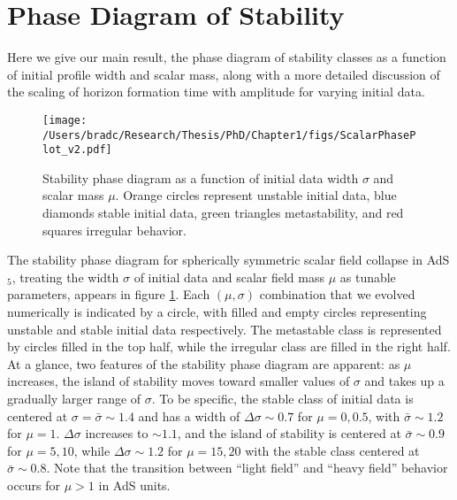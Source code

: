 \documentclass[../PhD.tex]{subfiles}
\begin{document}

\section{Phase Diagram of Stability}\label{s:phases}
Here we give our main result, the phase diagram of stability classes
as a function of initial profile width and scalar mass, along with a
more detailed discussion of the scaling of horizon formation time with
amplitude for varying initial data.

\begin{figure}[!t]
\centering
\texttt{[image: /Users/bradc/Research/Thesis/PhD/Chapter1/figs/ScalarPhasePlot\_v2.pdf]}
\caption[Stability phase diagram]{Stability phase diagram as a function of initial data width 
$\sigma$ and scalar mass $\mu$.  Orange circles represent unstable initial 
data, blue diamonds stable initial data, green triangles 
metastability, and red squares irregular behavior.}
\label{f:phase}
\end{figure}

The stability phase diagram for spherically
symmetric scalar field collapse in AdS$_5$, treating the width $\sigma$
of initial data and scalar field mass $\mu$ as tunable parameters,
appears in figure \ref{f:phase}.  Each $(\mu,\sigma)$ combination that
we evolved numerically is indicated by a circle, with filled and empty
circles representing unstable and stable initial data respectively.  The
metastable class is represented by circles filled in the top half, while
the irregular class are filled in the right half.  At a glance, two features
of the stability phase diagram are apparent: as $\mu$ increases, the island
of stability moves toward smaller values of $\sigma$ and takes up a
gradually larger range of $\sigma$.  To be specific, the stable class of initial
data is centered at $\sigma=\bar\sigma\sim 1.4$ and has a width of
$\Delta\sigma\sim 0.7$ for $\mu=0,0.5$, with $\bar\sigma\sim 1.2$ for $\mu=1$.
$\Delta\sigma$ increases to $\sim 1.1$, and the island of
stability is centered at
$\bar\sigma\sim 0.9$ for $\mu=5,10$, while $\Delta\sigma\sim 1.2$
for $\mu=15,20$ with the stable class centered at $\bar\sigma\sim 0.8$.
Note that the transition between ``light field'' and ``heavy field'' 
behavior occurs for $\mu>1$ in AdS units.
\end{document}
